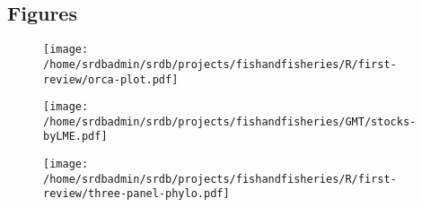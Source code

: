 


\subsection*{Figures}

\begin{landscape}
\begin{figure}
\begin{center}
\texttt{[image: /home/srdbadmin/srdb/projects/fishandfisheries/R/first-review/orca-plot.pdf]}
\end{center}
\caption{ }\label{fig:orca}
\end{figure}
\end{landscape}

\begin{landscape}
\begin{figure}
\begin{center}
\texttt{[image: /home/srdbadmin/srdb/projects/fishandfisheries/GMT/stocks-byLME.pdf]}
\end{center}
\caption{ }\label{fig:lmes}
\end{figure}
\end{landscape}


\begin{figure}
\begin{center}
\texttt{[image: /home/srdbadmin/srdb/projects/fishandfisheries/R/first-review/three-panel-phylo.pdf]} %
\end{center}
\caption{ }\label{fig:taxo:threepanel}
\end{figure}


